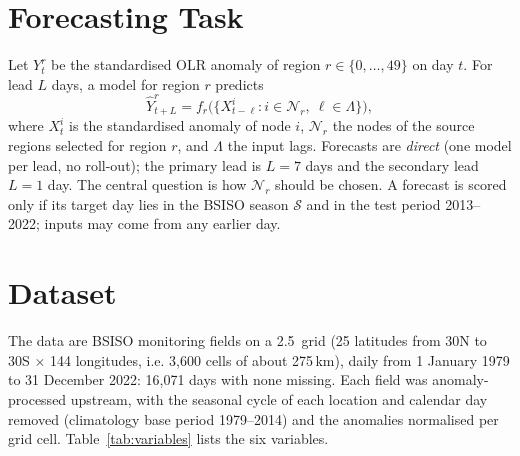 \label{chap:data}

\section{Forecasting Task}
\label{sec:data-task}

Let $Y^r_t$ be the standardised OLR anomaly of region $r\in\{0,\dots,49\}$ on day $t$. For lead $L$ days, a model for region $r$ predicts
\begin{equation}
  \hat{Y}^{r}_{t+L} = f_{r}\big(\{X^{i}_{t-\ell}: i\in\mathcal{N}_r,\ \ell\in\Lambda\}\big),
  \label{eq:task}
\end{equation}
where $X^i_t$ is the standardised anomaly of node $i$, $\mathcal{N}_r$ the nodes of the source regions selected for region $r$, and $\Lambda$ the input lags. Forecasts are \emph{direct} (one model per lead, no roll-out); the primary lead is $L=7$ days and the secondary lead $L=1$ day. The central question is how $\mathcal{N}_r$ should be chosen. A forecast is scored only if its target day lies in the BSISO season $\mathcal{S}$ and in the test period 2013--2022; inputs may come from any earlier day.

\section{Dataset}
\label{sec:data-provenance}

The data are BSISO monitoring fields on a 2.5\dg\ grid (25 latitudes from 30\dg N to 30\dg S $\times$ 144 longitudes, i.e. 3{,}600 cells of about 275\,km), daily from 1 January 1979 to 31 December 2022: 16{,}071 days with none missing. Each field was anomaly-processed upstream, with the seasonal cycle of each location and calendar day removed (climatology base period 1979--2014) and the anomalies normalised per grid cell. Table~\ref{tab:variables} lists the six variables.

